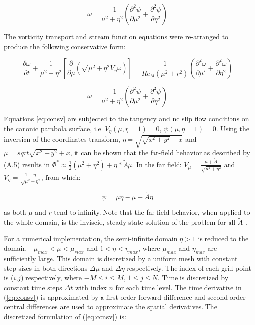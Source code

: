 \documentclass{article}
\newcommand{\pd}{\partial}
\begin{document}
\begin{equation}
\omega = \frac{-1}{\mu^2 + \eta^2} \left(\frac{\pd^2 \psi}{\pd \mu^2} + \frac{\pd^2 \psi}{\pd \eta^2} \right)
\end{equation}

The vorticity transport and stream function equations were re-arranged to produce the following conservative form:

\[
\frac{\pd \omega}{\pd t} + \frac{1}{\mu^2 + \eta^2} \left[\frac{\pd}{\pd \mu} \left(\sqrt{\mu^2 + \eta^2} V_\eta \omega \right) \right] = \frac{1}{Re_M(\mu^2 + \eta^2)} \left(\frac{\pd^2 \omega}{\pd \mu^2} + \frac{\pd^2 \omega}{\pd \eta^2} \right)
\]

\begin{equation}
\omega = \frac{-1}{\mu^2 + \eta^2} \left(\frac{\pd^2 \psi}{\pd \mu^2} + \frac{\pd^2 \psi}{\pd \eta^2} \right)
\label{eq:consv}
\end{equation}

Equations \ref{eq:consv} are subjected to the tangency and no slip flow conditions on the canonic parabola surface, i.e. $V_\eta(\mu,\eta=1) = 0$, $\psi(\mu,\eta=1) = 0$. Using the inversion of the coordinates transform, $\eta = \sqrt{ \sqrt{x^2+y^2} - x}$ and $\mu = sqrt{ \sqrt{x^2+y^2} + x}$, it can be shown that the far-field behavior as described by (A.5) results in
$\Phi^* \approx \frac{1}{2} (\mu^2+\eta^2) + \eta * \tilde{A}\mu$.
In the far field:
$V_\mu = \frac{\mu + \tilde{A}}{\sqrt{\mu^2 + \eta^2}}$ and $V_\eta = \frac{1 - \eta}{\sqrt{\mu^2 + \eta^2}}$, from which:

\begin{equation}
\psi = \mu\eta - \mu + \tilde{A}\eta
\end{equation}

as both $\mu$ and $\eta$ tend to infinity. Note that the far field behavior, when applied to the whole domain, is the inviscid, steady-state solution of the problem for all $\tilde{A}$ .

For a numerical implementation, the semi-infinite domain $\eta > 1$ is reduced to the domain $-\mu_{max} < \mu < \mu_{max}$ and $1 < \eta < \eta_{max}$, where $\mu_{max}$ and $\eta_{max}$ are sufficiently large. This domain is discretized by a uniform mesh with constant step sizes in both directions $\Delta \mu$ and $\Delta \eta$ respectively. The index of each grid point is ($i$,$j$) respectively, where $-M \le i \le M$, $1 \le j \le N$. Time is discretized by constant time steps $\Delta t$ with index $n$ for each time level. The time
derivative in
(\ref{eq:consv})
is approximated by a first-order forward difference and second-order central
differences are used to approximate the spatial derivatives. The discretized formulation of (\ref{eq:consv}) is:
\end{document}

